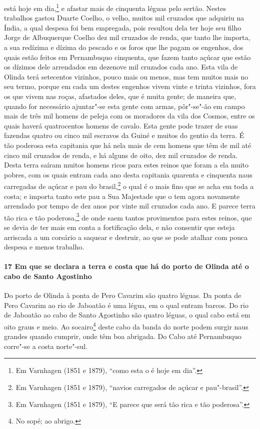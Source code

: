 \begin{linenumbers}
está hoje em dia,\footnote{ Em Varnhagen (1851 e 1879), ``como esta o é hoje em dia''.} e
afastar mais de cinquenta léguas pelo sertão. Nestes trabalhos gastou Duarte Coelho, o
velho, muitos mil cruzados que adquiriu na Índia, a qual despesa foi bem empregada, pois
resultou dela ter hoje seu filho Jorge de Albuquerque Coelho dez mil cruzados de renda,
que tanto lhe importa, a sua redízima e dízima do pescado e os foros que lhe pagam os
engenhos, dos quais estão feitos em Pernambuquo cinquenta, que fazem tanto açúcar que
estão os dízimos dele arrendados em dezenove mil cruzados cada ano. Esta vila de Olinda
terá setecentos vizinhos, pouco mais ou menos, mas tem muitos mais no seu termo, porque em
cada um destes engenhos vivem vinte e trinta vizinhos, fora os que vivem nas roças,
afastados deles, que é muita gente; de maneira que, quando for necessário ajuntar"-se esta
gente com armas, pôr"-se"-ão em campo mais de três mil homens de peleja com os moradores da
vila dos Cosmos, entre os quais haverá quatrocentos homens de cavalo. Esta gente pode
trazer de suas fazendas quatro ou cinco mil escravos da Guiné e muitos do gentio da terra.
É tão poderosa esta capitania que há nela mais de cem homens que têm de mil até cinco mil
cruzados de renda, e há alguns de oito, dez mil cruzados de renda. Desta terra saíram
muitos homens ricos para estes reinos que foram a ela muito pobres, com os quais entram
cada ano desta capitania quarenta e cinquenta naus carregadas de açúcar e pau do
brasil,\footnote{ Em Varnhagen (1851 e 1879), ``navios carregados de açúcar e
pau"-brasil''.} o qual é o mais fino que se acha em toda a costa; e importa tanto este pau
a Sua Majestade que o tem agora novamente arrendado por tempo de dez anos por vinte mil
cruzados cada ano. E parece terra tão rica e tão poderosa,\footnote{ Em Varnhagen (1851 e
1879), ``E parece que será tão rica e tão poderosa''.} de onde saem tantos provimentos
para estes reinos, que se devia de ter mais em conta a fortificação dela, e não consentir
que esteja arriscada a um corsário a saquear e destruir, ao que se pode atalhar com pouca
despesa e menos trabalho.

\paragraph{17 Em que se declara a terra e costa que há do porto de Olinda até o cabo de
Santo Agostinho} \quad
Do porto de Olinda à ponta de Pero Cavarim são quatro léguas. Da ponta de Pero Cavarim ao
rio de Jaboatão é uma légua, em o qual entram barcos. Do rio de Jaboatão ao cabo de Santo
Agostinho são quatro léguas, o qual cabo está em oito graus e meio. Ao socairo\footnote{
No sopé; ao abrigo.} deste cabo da banda do norte podem surgir naus grandes quando
cumprir, onde têm boa abrigada. Do Cabo até Pernambuquo corre"-se a costa norte"-sul.


\end{linenumbers}
